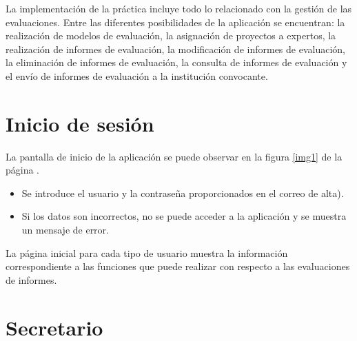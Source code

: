 \documentclass[11pt,a4paper,spanish,twoside]{book}
\begin{document}
La implementación de la práctica incluye todo lo relacionado con la gestión de
las e\-va\-lua\-cio\-nes. Entre las diferentes posibilidades de la aplicación se
encuentran: la realización de modelos de evaluación, la asignación de proyectos
a expertos, la realización de informes de evaluación, la modificación de
informes de evaluación, la eliminación de informes de evaluación, la consulta
de informes de evaluación y el envío de informes de evaluación a la institución
convocante. 

\section{Inicio de sesión}
La pantalla de inicio de la aplicación se puede observar en la figura
\ref{img1} de la página \pageref{img1}.


\begin{itemize}
\item Se introduce el usuario y la contraseña proporcionados en el correo de 
alta).

\item Si los datos son incorrectos, no se puede acceder a la aplicación y se
  muestra un mensaje de error. 
\end{itemize}

La página inicial para cada tipo de usuario muestra la información 
co\-rres\-pon\-dien\-te a las funciones que puede realizar con respecto a las 
evaluaciones de informes.


\section{Secretario}
\end{document}
